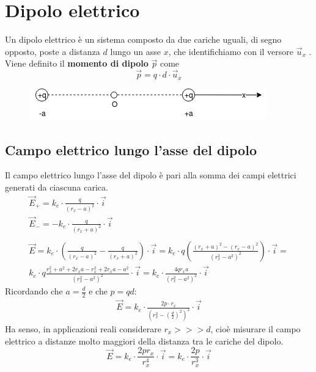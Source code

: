 \section{Dipolo elettrico}
Un dipolo elettrico è un sistema composto da due cariche uguali, di segno opposto, poste a distanza $d$ lungo un asse $x$, che identifichiamo con il versore $\vec{u}_x$ .\\
Viene definito il \textbf{momento di dipolo} $\vec{p}$ come 
\begin{displaymath}
\vec{p} = q \cdot d \cdot \vec{u}_x
\end{displaymath}
\begin{figure}[h!]
	\centering
    \includegraphics[scale=0.6]{DipoloElettrico}
\end{figure}


\subsection{Campo elettrico lungo l'asse del dipolo}
Il campo elettrico lungo l'asse del dipolo è pari alla somma dei campi elettrici generati da ciascuna carica.
\begin{displaymath}\begin{aligned}
	\vec{E}_+ = k_e \cdot \frac{q}{(r_x - a)^2} \cdot \vec{i}\\
    \vec{E}_- = - k_e \cdot \frac{q}{(r_x + a)^2} \cdot \vec{i}\\\\
    \vec{E} = k_e \cdot \left(\frac{q}{(r_x - a)^2} - \frac{q}{(r_x + a)^2} \right) \cdot \vec{i} = 
    k_e \cdot q \left( \frac{(r_x + a)^2 - (r_x - a)^2}{(r_x^2 - a^2)^2} \right) \cdot \vec{i} = \\
    k_e \cdot q \frac{r_x^2 + a^2 + 2 r_x a - r_x^2 +2 r_x a - a^2}{(r_x^2 - a^2)^2} \cdot \vec{i} = 
    k_e \cdot \frac{4 q r_x a}{(r_x^2 - a^2)^2} \cdot \vec{i}
\end{aligned}\end{displaymath}
Ricordando che $a = \frac{d}{2}$ e che $p = qd$:
\begin{displaymath}\begin{aligned}
	\vec{E} = k_e \cdot \frac{2p\cdot r_x}{(r_x^2 - (\frac{d}{2})^2)^2} \cdot \vec{i}    
\end{aligned}\end{displaymath}
Ha senso, in applicazioni reali considerare $r_x >>> d$, cioè misurare il campo elettrico a distanze molto maggiori della distanza tra le cariche del dipolo.
\begin{displaymath}
\vec{E} = k_e \cdot \frac{2 p r_x}{r_x^4} \cdot \vec{i} = k_e \cdot \frac{2p}{r_x^3} \cdot \vec{i}
\end{displaymath}

